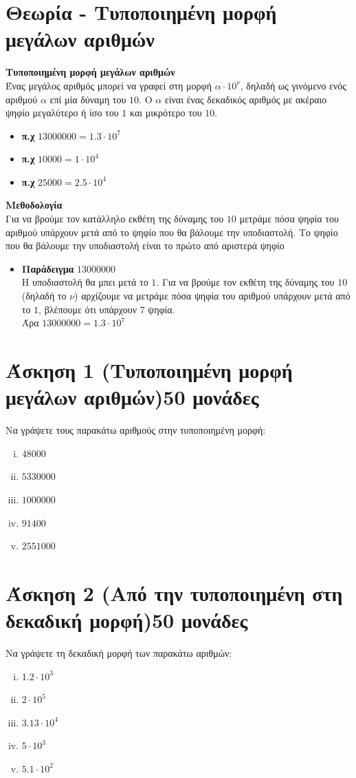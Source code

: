 \documentclass[a4paper,10pt]{report}
\begin{document}
\section*{Θεωρία - Τυποποιημένη μορφή μεγάλων αριθμών\hfill \small{}}
\textbf{Τυποποιημένη μορφή μεγάλων αριθμών}\\
Ένας μεγάλος αριθμός μπορεί να γραφεί στη μορφή $α\cdot10^{ν}$, δηλαδή ως γινόμενο ενός αριθμού $α$ επί μία δύναμη 
του $10$. Ο $α$ είναι ένας δεκαδικός αριθμός με ακέραιο ψηφίο μεγαλύτερο ή ίσο του $1$ και μικρότερο του $10$.
\begin{itemize}
 \item \textbf{π.χ} $13000000=1.3\cdot 10^{7}$
 \item \textbf{π.χ} $10000=1\cdot10^{4}$
 \item \textbf{π.χ} $25000=2.5 \cdot 10^{4}$
\end{itemize}
\textbf{Μεθοδολογία}\\
Για να βρούμε τον κατάλληλο εκθέτη της δύναμης του $10$ μετράμε πόσα ψηφία του αριθμού υπάρχουν μετά από το ψηφίο που θα 
βάλουμε την υποδιαστολή.
Το ψηφίο που θα βάλουμε την υποδιαστολή είναι το πρώτο από αριστερά ψηφίο
\begin{itemize}
 \item \textbf{Παράδειγμα} $13000000$\\
        Η υποδιαστολή θα μπει μετά το $1$. Για να βρούμε τον εκθέτη της δύναμης του $10$ (δηλαδή το $ν$) 
        αρχίζουμε να μετράμε πόσα ψηφία του αριθμού υπάρχουν μετά από το $1$, βλέπουμε ότι υπάρχουν $7$ ψηφία.\\
        Άρα $13000000=1.3\cdot 10^{7}$
\end{itemize}


\section*{Άσκηση 1  (Τυποποιημένη μορφή μεγάλων αριθμών)\hfill \small{50 μονάδες}}
Να γράψετε τους παρακάτω αριθμούς στην τυποποιημένη μορφή:
\begin{enumerate}[i)]
 \item $48000$
 \item $5330000$
 \item $1000000$
 \item $91400$
 \item $2551000$
\end{enumerate}


\section*{Άσκηση 2  (Από την τυποποιημένη στη δεκαδική μορφή)\hfill \small{50 μονάδες}}
Να γράψετε τη δεκαδική μορφή των παρακάτω αριθμών:
\begin{enumerate}[i)]
 \item $1.2\cdot 10^{3}$
 \item $2\cdot10^{5}$
 \item $3.13\cdot 10^{4}$
 \item $5\cdot10^{3}$
 \item $5.1\cdot 10^{2}$
\end{enumerate}
\end{document}
